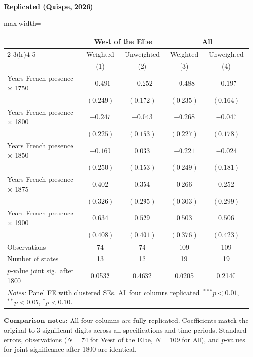 \documentclass[11pt,a4paper]{article}
\begin{document}
\begin{minipage}[t]{0.48\textwidth}
\centering
\textbf{\large Replicated (Quispe, 2026)}
\vspace{0.3cm}

\begin{adjustbox}{max width=\textwidth}
\begin{tabular}{lcccc}
\toprule
 & \multicolumn{2}{c}{West of the Elbe} & \multicolumn{2}{c}{All} \\
\cmidrule(lr){2-3}\cmidrule(lr){4-5}
 & Weighted & Unweighted & Weighted & Unweighted \\
 & (1) & (2) & (3) & (4) \\
\midrule
Years French presence $\times$ 1750 & $-0.491$ & $-0.252$ & $-0.488$ & $-0.197$ \\
 & $(0.249)$ & $(0.172)$ & $(0.235)$ & $(0.164)$ \\[0.3em]
Years French presence $\times$ 1800 & $-0.247$ & $-0.043$ & $-0.268$ & $-0.047$ \\
 & $(0.225)$ & $(0.153)$ & $(0.227)$ & $(0.178)$ \\[0.3em]
Years French presence $\times$ 1850 & $-0.160$ & $0.033$ & $-0.221$ & $-0.024$ \\
 & $(0.250)$ & $(0.153)$ & $(0.249)$ & $(0.181)$ \\[0.3em]
Years French presence $\times$ 1875 & $0.402$ & $0.354$ & $0.266$ & $0.252$ \\
 & $(0.326)$ & $(0.295)$ & $(0.303)$ & $(0.299)$ \\[0.3em]
Years French presence $\times$ 1900 & $0.634$ & $0.529$ & $0.503$ & $0.506$ \\
 & $(0.408)$ & $(0.401)$ & $(0.376)$ & $(0.423)$ \\[0.3em]
\midrule
Observations & 74 & 74 & 109 & 109 \\
Number of states & 13 & 13 & 19 & 19 \\
$p$-value joint sig.\ after 1800 & 0.0532 & 0.4632 & 0.0205 & 0.2140 \\
\bottomrule
\multicolumn{5}{p{0.95\textwidth}}{\footnotesize\textit{Notes:} Panel FE with clustered SEs. All four columns replicated. $^{***}p<0.01$, $^{**}p<0.05$, $^{*}p<0.10$.}
\end{tabular}
\end{adjustbox}
\end{minipage}

\vspace{1cm}
\textbf{Comparison notes:} All four columns are fully replicated. Coefficients match the original to 3 significant digits across all specifications and time periods. Standard errors, observations ($N = 74$ for West of the Elbe, $N = 109$ for All), and $p$-values for joint significance after 1800 are identical.
\end{document}
